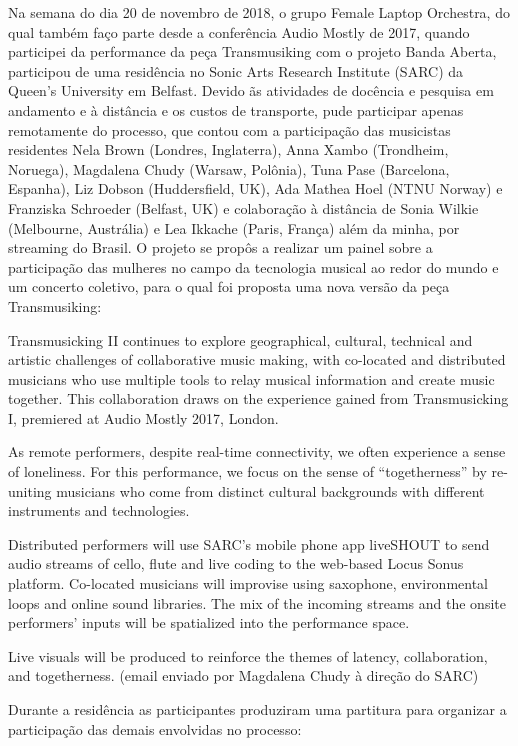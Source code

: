 Na semana do dia 20 de novembro de 2018, o grupo Female Laptop Orchestra, do qual também faço parte desde a conferência Audio Mostly de 2017, quando participei da performance da peça Transmusiking com o projeto Banda Aberta, participou de uma residência no Sonic Arts Research Institute (SARC) da Queen's University em Belfast. Devido ãs atividades de docência e pesquisa em andamento e à distância e os custos de transporte, pude participar apenas remotamente do processo, que contou com a participação das musicistas residentes Nela Brown (Londres, Inglaterra), Anna Xambo (Trondheim, Noruega), Magdalena Chudy (Warsaw, Polônia), Tuna Pase (Barcelona, Espanha), Liz Dobson (Huddersfield, UK), Ada Mathea Hoel (NTNU Norway) e Franziska Schroeder (Belfast, UK) e colaboração à distância de Sonia Wilkie (Melbourne, Austrália) e Lea Ikkache (Paris, França) além da minha, por streaming do Brasil. O projeto se propôs a realizar um painel sobre a participação das mulheres no campo da tecnologia musical ao redor do mundo e um concerto coletivo, para o qual foi proposta uma nova versão da peça Transmusiking:


\begin{citacao}
Transmusicking II continues to explore geographical, cultural, technical and artistic challenges of collaborative music making, with co-located and distributed musicians who use multiple tools to relay musical information and create music together. This collaboration draws on the experience gained from Transmusicking I, premiered at Audio Mostly 2017, London.

As remote performers, despite real-time connectivity, we often experience a sense of loneliness. For this performance, we focus on the sense of “togetherness” by re-uniting musicians who come from distinct cultural backgrounds with different instruments and technologies. 

Distributed performers will use SARC’s mobile phone app liveSHOUT to send audio streams of cello, flute and live coding to the web-based Locus Sonus platform. Co-located musicians will improvise using saxophone, environmental loops and online sound libraries. 
The mix of the incoming streams and the onsite performers’ inputs will be spatialized into the performance space.

Live visuals will be produced to reinforce the themes of latency, collaboration, and togetherness. (email enviado por Magdalena Chudy à direção do SARC)
\end{citacao}

Durante a residência as participantes produziram uma partitura para organizar a participação das demais envolvidas no processo:

